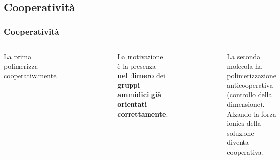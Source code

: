 \subsection{Cooperatività}\begin{frame}\frametitle{Cooperatività}
   \begin{columns} La prima polimerizza cooperativamente.\begin{figure}{}\end{figure}  La motivazione è la presenza \textbf{nel dimero} dei \textbf{gruppi ammidici già orientati correttamente}.             \cite{tesi}
\begin{figure}{}\end{figure}
La seconda molecola ha polimerizzazione anticooperativa (controllo della dimensione). Alzando la forza ionica della soluzione diventa cooperativa. \cite{2}\end{columns}            

\end{frame}
